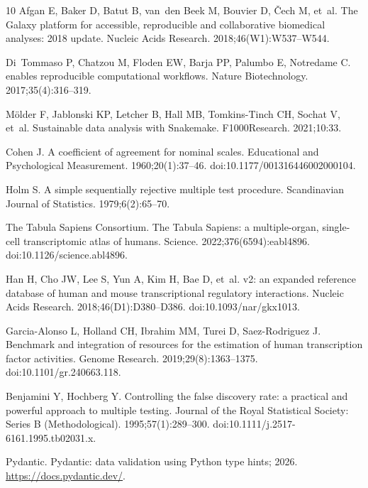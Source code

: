 \documentclass[10pt,letterpaper]{article}
\begin{document}
\begin{thebibliography}{10}
Afgan E, Baker D, Batut B, van~den Beek M, Bouvier D, {\v{C}}ech M, et~al.
\newblock The {Galaxy} platform for accessible, reproducible and collaborative
  biomedical analyses: 2018 update.
\newblock Nucleic Acids Research. 2018;46(W1):W537--W544.

Di~Tommaso P, Chatzou M, Floden EW, Barja PP, Palumbo E, Notredame C.
 enables reproducible computational workflows.
\newblock Nature Biotechnology. 2017;35(4):316--319.

M{\"o}lder F, Jablonski KP, Letcher B, Hall MB, Tomkins-Tinch CH, Sochat V,
  et~al.
\newblock Sustainable data analysis with {Snakemake}.
\newblock F1000Research. 2021;10:33.

Cohen J.
\newblock A coefficient of agreement for nominal scales.
\newblock Educational and Psychological Measurement. 1960;20(1):37--46.
\newblock doi:{10.1177/001316446002000104}.

Holm S.
\newblock A simple sequentially rejective multiple test procedure.
\newblock Scandinavian Journal of Statistics. 1979;6(2):65--70.

{The Tabula Sapiens Consortium}.
\newblock The {Tabula Sapiens}: a multiple-organ, single-cell transcriptomic
  atlas of humans.
\newblock Science. 2022;376(6594):eabl4896.
\newblock doi:{10.1126/science.abl4896}.

Han H, Cho JW, Lee S, Yun A, Kim H, Bae D, et~al.
 v2: an expanded reference database of human and mouse
  transcriptional regulatory interactions.
\newblock Nucleic Acids Research. 2018;46(D1):D380--D386.
\newblock doi:{10.1093/nar/gkx1013}.

Garcia-Alonso L, Holland CH, Ibrahim MM, Turei D, Saez-Rodriguez J.
\newblock Benchmark and integration of resources for the estimation of human
  transcription factor activities.
\newblock Genome Research. 2019;29(8):1363--1375.
\newblock doi:{10.1101/gr.240663.118}.

Benjamini Y, Hochberg Y.
\newblock Controlling the false discovery rate: a practical and powerful
  approach to multiple testing.
\newblock Journal of the Royal Statistical Society: Series B (Methodological).
  1995;57(1):289--300.
\newblock doi:{10.1111/j.2517-6161.1995.tb02031.x}.

{Pydantic}. Pydantic: data validation using {Python} type hints; 2026.
\newblock \url{https://docs.pydantic.dev/}.


\end{thebibliography}
\end{document}
